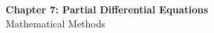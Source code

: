 \documentclass[12pt]{article}
\begin{document}
\begin{center}
  {\LARGE\bfseries Chapter 7: Partial Differential Equations}\\[0.25em]
  {\large Mathematical Methods}\\[0.15em]
\end{center}

\end{document}
